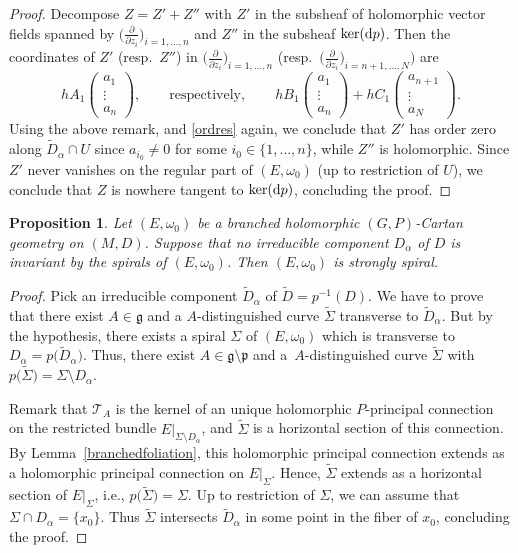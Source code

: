\documentclass[pdftex]{sigma}
\newcommand{\der}[2]{\frac{\partial #1}{\partial#2}}
\numberwithin{equation}{section}
\newtheorem{Proposition}[Theorem]{Proposition}
 { \theoremstyle{definition}
\newtheorem{Definition}[Theorem]{Definition}
\newtheorem{Note}[Theorem]{Note}
\newtheorem{Exemple}[Theorem]{Example}
\newtheorem{Remark}[Theorem]{Remark} }
\begin{document}
\begin{proof}
Decompose $Z=Z'+Z''$ with $Z'$ in the subsheaf of holomorphic vector fields spanned by $\big(\der{}{z_i}\big)_{i=1,\dots,n}$ and $Z''$ in the subsheaf $\ker({\rm d}p)$. Then the coordinates of $Z'$ (resp.\ $Z''$) in $\big(\der{}{z_i}\big)_{i=1,\dots,n}$ \big(resp.\ $\big(\der{}{z_i}\big)_{i=n+1,\dots,N}\big)$ are
\[
h A_1 \begin{pmatrix} a_1\\ \vdots \\ a_n \end{pmatrix}, \qquad \text{respectively},\qquad
h B_1 \begin{pmatrix} a_1 \\ \vdots \\ a_n \end{pmatrix} + h C_1 \begin{pmatrix} a_{n+1}\\ \vdots \\ a_N \end{pmatrix}.\]
 Using the above remark, and \eqref{ordres} again, we conclude that $Z'$ has order zero along $\tilde{D}_\alpha \cap U$ since $a_{i_0}\neq 0$ for some $i_0 \in \{1,\dots,n\}$, while $Z''$ is holomorphic. Since $Z'$ never vanishes on the regular part of $(E,\omega_0)$ (up to restriction of $U$), we conclude that $Z$ is nowhere tangent to $\ker({\rm d}p)$, concluding the proof.
\end{proof}

\begin{Proposition}\label{branchedtaucondition} Let $(E,\omega_0)$ be a branched holomorphic $(G,P)$-Cartan geometry on $(M,D)$. Suppose that no irreducible component $D_\alpha$ of $D$ is invariant by the spirals of $(E,\omega_0)$. Then $(E,\omega_0)$ is strongly spiral. \end{Proposition}

\begin{proof} Pick an irreducible component $\tilde{D}_\alpha$ of $\tilde{D}=p^{-1}(D)$. We have to prove that there exist $A\in \mathfrak{g}$ and a $A$-distinguished curve $\tilde{\Sigma}$ transverse to $\tilde{D}_\alpha$. But by the hypothesis, there exists a spiral $\Sigma$ of $(E,\omega_0)$ which is transverse to $D_\alpha = p\big(\tilde{D}_\alpha\big)$. Thus, there exist $A\in \mathfrak{g}\setminus \mathfrak{p}$ and a~$A$-distinguished curve $\tilde{\Sigma}$ with $p\big(\tilde{\Sigma}\big)= \Sigma \setminus D_\alpha$.

Remark that $\mathcal{T}_A$ is the kernel of an unique holomorphic $P$-principal connection on the restricted bundle $E\vert_{\Sigma\setminus D_\alpha}$, and $\tilde{\Sigma}$ is a horizontal section of this connection. By Lemma~\ref{branchedfoliation}, this holomorphic principal connection extends as a holomorphic principal connection on $E\vert_{\Sigma}$. Hence, $\tilde{\Sigma}$ extends as a horizontal section of $E\vert_{\Sigma}$, i.e., $p\big(\tilde{\Sigma}\big)=\Sigma$.
Up to restriction of $\Sigma$, we can assume that $\Sigma \cap D_\alpha =\{x_0\}$. Thus $\tilde{\Sigma}$ intersects $\tilde{D}_\alpha$ in some point in the fiber of $x_0$, concluding the proof.
\end{proof}
\end{document}
